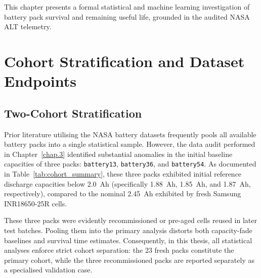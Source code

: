 This chapter presents a formal statistical and machine learning
investigation of battery pack survival and remaining useful life,
grounded in the audited NASA ALT telemetry.

\section{Cohort Stratification and Dataset Endpoints}

\subsection{Two-Cohort Stratification}

Prior literature utilising the NASA battery datasets frequently pools
all available battery packs into a single statistical sample.
However, the data audit performed in Chapter~\ref{chap.3} identified
substantial anomalies in the initial baseline capacities of three packs:
\texttt{battery13}, \texttt{battery36}, and \texttt{battery54}.
As documented in Table~\ref{tab:cohort_summary}, these three packs
exhibited initial reference discharge capacities below \SI{2.0}{Ah}
(specifically \SI{1.88}{Ah}, \SI{1.85}{Ah}, and \SI{1.87}{Ah},
respectively), compared to the nominal \SI{2.45}{Ah} exhibited by fresh
Samsung INR18650-25R cells.

\begin{table}[htbp]
  \centering
  \caption{Cohort stratification of the 26 NASA ALT battery packs.}
  \label{tab:cohort_summary}
\end{table}

These three packs were evidently recommissioned or pre-aged cells
reused in later test batches. Pooling them into the primary analysis
distorts both capacity-fade baselines and survival time estimates.
Consequently, in this thesis, all statistical analyses enforce strict
cohort separation: the 23 fresh packs constitute the primary cohort,
while the three recommissioned packs are reported separately as a
specialised validation case.

